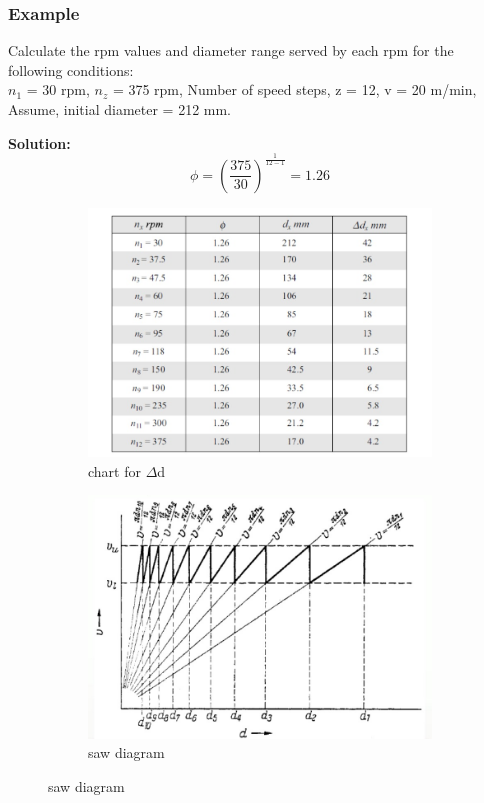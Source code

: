 \documentclass{article}
\begin{document}
\subsubsection*{Example}
Calculate the rpm values and diameter range served by each rpm for
the following conditions:\\
$n_1$ = 30 rpm,
$n_z$ = 375 rpm,
Number of speed steps, z = 12,
v = 20 m/min, Assume, initial diameter = 212 mm.

\textbf{Solution:}\\
$$\phi = \left(\frac{375}{30}\right)^{\frac{1}{12-1}} = 1.26$$

\begin{figure}[h]
  \centering

  \begin{subfigure}{0.48\textwidth}
    \centering
    \includegraphics[width=\linewidth]{img/table_d.jpeg}
    \caption{chart for $\Delta$d}
  \end{subfigure}
  \hfill
  \begin{subfigure}{0.48\textwidth}
    \centering
    \includegraphics[width=\linewidth]{img/saw_dia.jpeg}
    \caption{saw diagram}
    \label{fig:saw diagram}
  \end{subfigure}
\end{figure}
\end{document}
